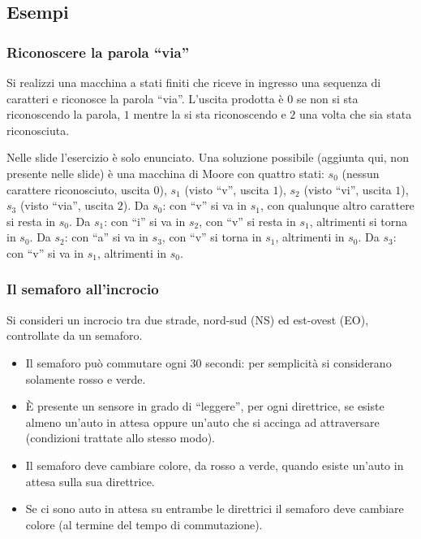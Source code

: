 \documentclass[11pt,a4paper]{article}
\begin{document}
\subsection{Esempi}

\subsubsection{Riconoscere la parola ``via''}

\begin{esercizio}
Si realizzi una macchina a stati finiti che riceve in ingresso una sequenza di caratteri e riconosce la parola ``via''. L'uscita prodotta è $0$ se non si sta riconoscendo la parola, $1$ mentre la si sta riconoscendo e $2$ una volta che sia stata riconosciuta.
\end{esercizio}

\begin{osservazione}
Nelle slide l'esercizio è solo enunciato. Una soluzione possibile (aggiunta qui, non presente nelle slide) è una macchina di Moore con quattro stati: $s_0$ (nessun carattere riconosciuto, uscita $0$), $s_1$ (visto ``v'', uscita $1$), $s_2$ (visto ``vi'', uscita $1$), $s_3$ (visto ``via'', uscita $2$). Da $s_0$: con ``v'' si va in $s_1$, con qualunque altro carattere si resta in $s_0$. Da $s_1$: con ``i'' si va in $s_2$, con ``v'' si resta in $s_1$, altrimenti si torna in $s_0$. Da $s_2$: con ``a'' si va in $s_3$, con ``v'' si torna in $s_1$, altrimenti in $s_0$. Da $s_3$: con ``v'' si va in $s_1$, altrimenti in $s_0$.
\end{osservazione}

\subsubsection{Il semaforo all'incrocio}

Si consideri un incrocio tra due strade, nord-sud (NS) ed est-ovest (EO), controllate da un semaforo.
\begin{itemize}
    \item Il semaforo può commutare ogni $30$ secondi: per semplicità si considerano solamente rosso e verde.
    \item È presente un sensore in grado di ``leggere'', per ogni direttrice, se esiste almeno un'auto in attesa oppure un'auto che si accinga ad attraversare (condizioni trattate allo stesso modo).
    \item Il semaforo deve cambiare colore, da rosso a verde, quando esiste un'auto in attesa sulla sua direttrice.
    \item Se ci sono auto in attesa su entrambe le direttrici il semaforo deve cambiare colore (al termine del tempo di commutazione).
\end{itemize}
\end{document}
